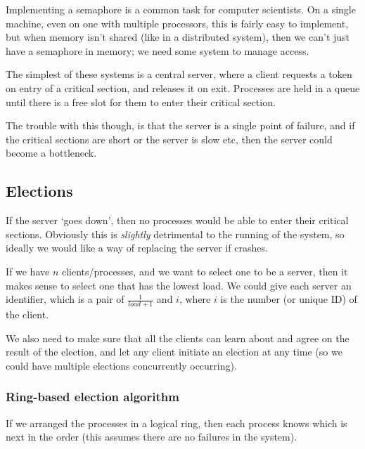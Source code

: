 Implementing a semaphore is a common task for computer scientists.
 On a single machine,
even on one with multiple processors, this is fairly easy to implement, but when
memory isn't shared (like in a distributed system), then we can't just have a
semaphore in memory; we need some system to manage access.

The simplest of these systems is a central server, where a client requests a
token on entry of a critical section, and releases it on exit. Processes are
held in a queue until there is a free slot for them to enter their critical
section.

The trouble with this though, is that the server is a single point of failure,
and if the critical sections are short or the server is slow etc, then the
server could become a bottleneck.

\subsection{Elections}

If the server `goes down', then no processes would be able to enter their
critical sections. Obviously this is \textit{slightly} detrimental to the
running of the system, so ideally we would like a way of replacing the server if
crashes.

If we have $n$ clients/processes, and we want to select one to be a server, then
it makes sense to select one that has the lowest load. We could give each server
an identifier, which is a pair of $\frac{1}{load + 1}$ and $i$, where $i$ is the
number (or unique ID) of the client.

We also need to make sure that all the clients can learn about and agree on the
result of the election, and let any client initiate an election at any time (so
we could have multiple elections concurrently occurring).

\subsubsection{Ring-based election algorithm}

If we arranged the processes in a logical ring, then each process knows which is
next in the order (this assumes there are no failures in the system).

